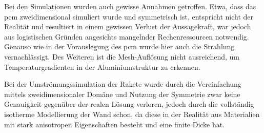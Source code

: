 Bei den Simulationen wurden auch gewisse Annahmen getroffen. Etwa, dass das \ac{pcm} zweidimensional simuliert wurde und symmetrisch ist, entspricht
nicht der Realität und resultiert in einem gewissen Verlust der Aussagekraft, war jedoch aus logistischen Gründen angesichts mangelnder Rechenressourcen notwendig.
Genauso wie in der Vorauslegung des \ac{pcm} wurde hier auch die Strahlung vernachlässigt. Des Weiteren ist die Mesh-Auflösung nicht ausreichend, um
Temperaturgradienten in der Aluminiumstruktur zu erkennen.

Bei der Umströmungssimulation der Rakete wurde durch die Vereinfachung mittels zweidimensionaler Domäne und Nutzung der Symmetrie zwar keine
Genauigkeit gegenüber der realen Lösung verloren, jedoch durch die vollständig isotherme Modellierung der Wand schon, da diese in der
Realität aus Materialien mit stark anisotropen Eigenschaften besteht und eine finite Dicke hat.